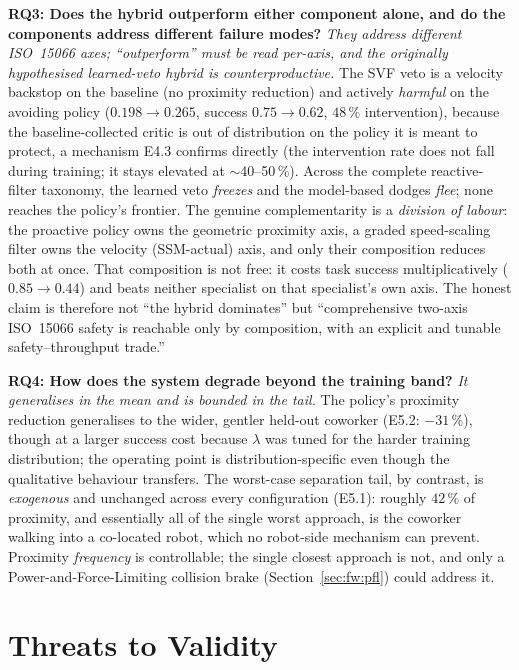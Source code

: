 \documentclass[11pt,a4paper]{report}
\newcommand{\ssm}{SSM}
\newcommand{\iso}{ISO~15066}
\begin{document}
\textbf{RQ3: Does the hybrid outperform either component alone, and do
the components address different failure modes?} \emph{They address
different \iso{} axes; ``outperform'' must be read per-axis, and the
originally hypothesised learned-veto hybrid is counterproductive.} The
SVF veto is a velocity backstop on the baseline (no proximity
reduction) and actively \emph{harmful} on the avoiding policy
($0.198 \to 0.265$, success $0.75 \to 0.62$, $48\,\%$ intervention),
because the baseline-collected critic is out of distribution on the
policy it is meant to protect, a mechanism E4.3 confirms directly (the
intervention rate does not fall during training; it stays elevated at
$\sim$40--50\,\%). Across the complete reactive-filter taxonomy, the
learned veto \emph{freezes} and the model-based dodges \emph{flee};
none reaches the policy's frontier. The genuine complementarity is a
\emph{division of labour}: the proactive policy owns the geometric
proximity axis, a graded speed-scaling filter owns the velocity
(\ssm{}-actual) axis, and only their composition reduces both at once.
That composition is not free: it costs task success multiplicatively
($0.85 \to 0.44$) and beats neither specialist on that specialist's
own axis. The honest claim is therefore not ``the hybrid dominates''
but ``comprehensive two-axis \iso{} safety is reachable only by
composition, with an explicit and tunable safety--throughput trade.''

\textbf{RQ4: How does the system degrade beyond the training band?}
\emph{It generalises in the mean and is bounded in the tail.} The
policy's proximity reduction generalises to the wider, gentler
held-out coworker (E5.2: $-31\,\%$), though at a larger success cost
because $\lambda$ was tuned for the harder training distribution; the
operating point is distribution-specific even though the qualitative
behaviour transfers. The worst-case separation tail, by contrast, is
\emph{exogenous} and unchanged across every configuration (E5.1):
roughly $42\,\%$ of proximity, and essentially all of the single worst
approach, is the coworker walking into a co-located robot, which no
robot-side mechanism can prevent. Proximity \emph{frequency} is
controllable; the single closest approach is not, and only a
Power-and-Force-Limiting collision brake (Section~\ref{sec:fw:pfl})
could address it.

\section{Threats to Validity}
\label{sec:disc:threats}
\end{document}
